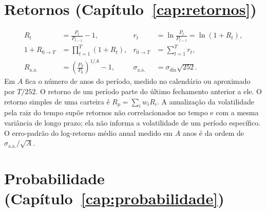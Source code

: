 \section{Retornos (Capítulo~\ref{cap:retornos})}

\begin{align*}
R_t &= \frac{P_t}{P_{t-1}} - 1 , & r_t &= \ln\frac{P_t}{P_{t-1}} = \ln(1+R_t) , \\
1 + R_{0\to T} &= \prod_{t=1}^{T}(1+R_t) , & r_{0\to T} &= \sum_{t=1}^{T} r_t , \\
R_{\text{a.a.}} &= \left(\frac{P_T}{P_0}\right)^{1/A} - 1 , & \sigma_{\text{a.a.}} &= \sigma_{\text{dia}}\sqrt{252} .
\end{align*}
Em $A$ fica o número de anos do período, medido no calendário ou aproximado por $T/252$. O retorno de um período parte do último fechamento anterior a ele. O retorno simples de uma carteira é $R_p = \sum_i w_i R_i$. A anualização da volatilidade pela raiz do tempo supõe retornos não correlacionados no tempo e com a mesma variância de longo prazo; ela não informa a volatilidade de um período específico. O erro-padrão do log-retorno médio anual medido em $A$ anos é da ordem de $\sigma_{\text{a.a.}}/\sqrt{A}$.

\section{Probabilidade (Capítulo~\ref{cap:probabilidade})}

